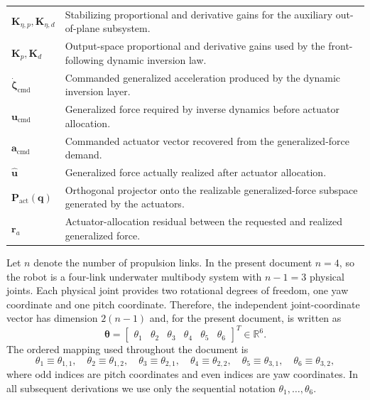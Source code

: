 \documentclass[12pt,a4paper]{report}
\begin{document}
{\begin{longtable}{@{}L{0.30\textwidth}L{0.66\textwidth}@{}}
$\mathbf{K}_{\eta,p}, \mathbf{K}_{\eta,d}$ & Stabilizing proportional and derivative gains for the auxiliary out-of-plane subsystem. \\
$\mathbf{K}_{p}, \mathbf{K}_{d}$ & Output-space proportional and derivative gains used by the front-following dynamic inversion law. \\
$\dot{\boldsymbol{\zeta}}_{\mathrm{cmd}}$ & Commanded generalized acceleration produced by the dynamic inversion layer. \\
$\mathbf{u}_{\mathrm{cmd}}$ & Generalized force required by inverse dynamics before actuator allocation. \\
$\mathbf{a}_{\mathrm{cmd}}$ & Commanded actuator vector recovered from the generalized-force demand. \\
$\hat{\mathbf{u}}$ & Generalized force actually realized after actuator allocation. \\
$\mathbf{P}_{\mathrm{act}}(\mathbf{q})$ & Orthogonal projector onto the realizable generalized-force subspace generated by the actuators. \\
$\mathbf{r}_a$ & Actuator-allocation residual between the requested and realized generalized force. \\
\end{longtable}
}

Let $n$ denote the number of propulsion links. In the present document $n=4$, so the robot is a four-link underwater multibody system with $n-1=3$ physical joints. Each physical joint provides two rotational degrees of freedom, one yaw coordinate and one pitch coordinate. Therefore, the independent joint-coordinate vector has dimension $2(n-1)$ and, for the present document, is written as
\begin{equation}
\boldsymbol{\theta} = \begin{bmatrix}
\theta_{1} & \theta_{2} & \theta_{3} & \theta_{4} & \theta_{5} & \theta_{6}
\end{bmatrix}^{T} \in \mathbb{R}^{6}.
\end{equation}
The ordered mapping used throughout the document is
\begin{equation}
\theta_{1}\equiv\theta_{1,1},\quad
\theta_{2}\equiv\theta_{1,2},\quad
\theta_{3}\equiv\theta_{2,1},\quad
\theta_{4}\equiv\theta_{2,2},\quad
\theta_{5}\equiv\theta_{3,1},\quad
\theta_{6}\equiv\theta_{3,2},
\end{equation}
where odd indices are pitch coordinates and even indices are yaw coordinates. In all subsequent derivations we use only the sequential notation $\theta_1,\ldots,\theta_6$.
\end{document}
